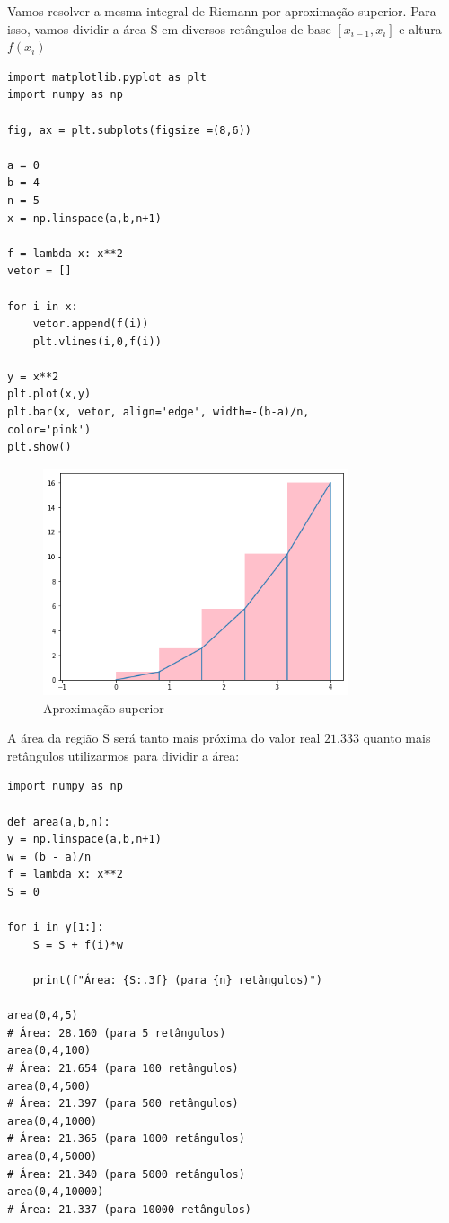 Vamos resolver a mesma integral de Riemann por aproximação superior. Para isso, vamos dividir a área S em diversos retângulos de base $[x_{i-1},x_{i}]$ e altura $f(x_{i})$

\begin{verbatim}
import matplotlib.pyplot as plt
import numpy as np

fig, ax = plt.subplots(figsize =(8,6))

a = 0
b = 4
n = 5
x = np.linspace(a,b,n+1)

f = lambda x: x**2
vetor = []

for i in x:
	vetor.append(f(i))
	plt.vlines(i,0,f(i))

y = x**2
plt.plot(x,y)
plt.bar(x, vetor, align='edge', width=-(b-a)/n, 
color='pink')
plt.show()
\end{verbatim}

\begin{figure}[H]
	\centering
	\includegraphics[width=0.8\textwidth]{./Imagens/Integral de Riemann/RI3.png} 
	\caption{Aproximação superior}
	\label{fig:RI3}
\end{figure}

A área da região S será tanto mais próxima do valor real $21.333$ quanto mais retângulos utilizarmos para dividir a área:

\begin{verbatim}
import numpy as np

def area(a,b,n):
y = np.linspace(a,b,n+1)
w = (b - a)/n
f = lambda x: x**2
S = 0

for i in y[1:]:
	S = S + f(i)*w 
	
	print(f"Área: {S:.3f} (para {n} retângulos)")

area(0,4,5)
# Área: 28.160 (para 5 retângulos)
area(0,4,100)
# Área: 21.654 (para 100 retângulos)
area(0,4,500)
# Área: 21.397 (para 500 retângulos)
area(0,4,1000)
# Área: 21.365 (para 1000 retângulos)
area(0,4,5000)
# Área: 21.340 (para 5000 retângulos)
area(0,4,10000)
# Área: 21.337 (para 10000 retângulos)

\end{verbatim}


